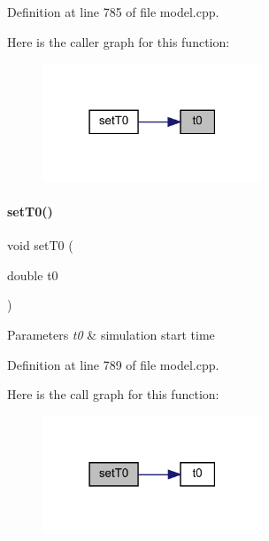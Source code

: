 Definition at line 785 of file model.\+cpp.

Here is the caller graph for this function\+:
\nopagebreak
\begin{figure}[H]
\begin{center}
\leavevmode
\includegraphics[width=186pt]{classamici_1_1_model_a223e567004c82b5facc2fe98cdd16855_icgraph}
\end{center}
\end{figure}
\mbox{\label{classamici_1_1_model_aaf5053fde7e205c89d89c000a7693987}} 
\paragraph{\texorpdfstring{setT0()}{setT0()}}
{\footnotesize\ttfamily void set\+T0 (\begin{DoxyParamCaption}\item[{double}]{t0 }\end{DoxyParamCaption})}


\begin{DoxyParams}{Parameters}
{\em t0} & simulation start time \\
\hline
\end{DoxyParams}


Definition at line 789 of file model.\+cpp.

Here is the call graph for this function\+:
\nopagebreak
\begin{figure}[H]
\begin{center}
\leavevmode
\includegraphics[width=186pt]{classamici_1_1_model_aaf5053fde7e205c89d89c000a7693987_cgraph}
\end{center}
\end{figure}
\mbox{\label{classamici_1_1_model_a6ac0de1b7dfddbb4a480657f62573563}} 
